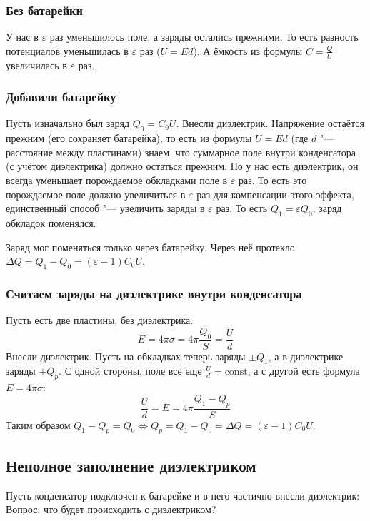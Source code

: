		\subsubsection{Без батарейки}
			У нас в $\varepsilon$ раз уменьшилось поле, а заряды остались прежними.
			То есть разность потенциалов уменьшилась в $\varepsilon$ раз ($U=Ed$).
			А ёмкость из формулы $C=\frac{Q}{U}$ увеличилась в $\varepsilon$ раз.

		\subsubsection{Добавили батарейку}
			Пусть изначально был заряд $Q_0=C_0U$.
			Внесли диэлектрик.
			Напряжение остаётся прежним (его сохраняет батарейка), то есть из формулы $U=Ed$ (где $d$ "--- расстояние между пластинами)
			знаем, что суммарное поле внутри конденсатора (с учётом диэлектрика) должно остаться прежним.
			Но у нас есть диэлектрик, он всегда уменьшает порождаемое обкладками поле в $\varepsilon$ раз.
			То есть это порождаемое поле должно увеличиться в $\varepsilon$ раз для компенсации этого эффекта,
			единственный способ "--- увеличить заряды в $\varepsilon$ раз.
			То есть $Q_1=\varepsilon Q_0$, заряд обкладок поменялся.
			\begin{Rem}
				Заряд мог поменяться только через батарейку.
				Через неё протекло $\Delta Q = Q_1 - Q_0 = (\varepsilon - 1)C_0U$.
			\end{Rem}

		\subsubsection{Считаем заряды на диэлектрике внутри конденсатора}
			Пусть есть две пластины, без диэлектрика.
			\[ E = 4\pi \sigma = 4\pi \frac{Q_0}S = \frac U d\]
			Внесли диэлектрик.
			Пусть на обкладках теперь заряды $\pm Q_1$, а в диэлектрике заряды $\pm Q_p$.
			С одной стороны, поле всё еще $\frac U d = \mathrm{const}$, а с другой есть формула $E = 4\pi \sigma$:
			\[ \frac U d = E = 4\pi \frac{Q_1-Q_p}{S}\]
			Таким образом $Q_1-Q_p=Q_0 \iff Q_p=Q_1-Q_0=\Delta Q = (\varepsilon-1)C_0U$.

	\subsection{Неполное заполнение диэлектриком}
		Пусть конденсатор подключен к батарейке и в него частично внесли диэлектрик:
		Вопрос: что будет происходить с диэлектриком?

